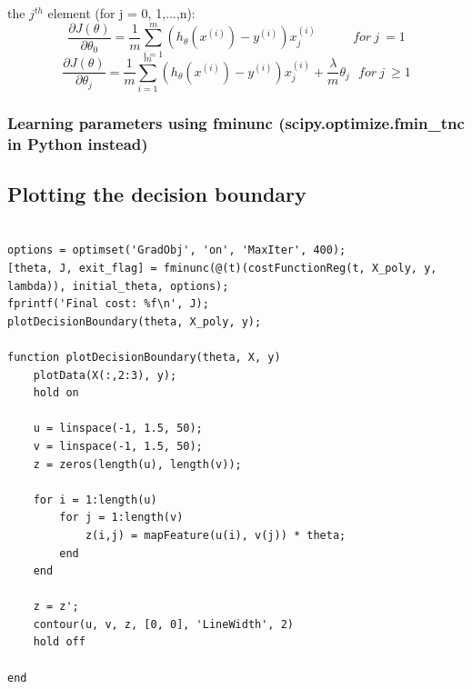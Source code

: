 \documentclass[a4paper, 12pt]{book}
\begin{document}
	\noindent the $j^{th}$ element (for j = 0, 1,...,n):
	\[
		\frac{\partial{J(\theta)} }{\partial {\theta_0}}
		=
		\frac{1}{m}  \sum_{i=1}^{m}  (h_\theta(x^{(i)}) - y^{(i)} ) x_j^{(i)}\ \ \ \ \  \ \ \ \ \ \ \ \ for\ j \ = 1
	\]
	\[
		\frac{\partial{J(\theta)} }{\partial {\theta_j}}
		=
		\frac{1}{m}  \sum_{i=1}^{m}  (h_\theta(x^{(i)}) - y^{(i)} ) x_j^{(i)} + \frac{\lambda}{m}\theta_j\ \ \ for\ j \ \ge 1
	\]
			\subsubsection{Learning parameters using fminunc (scipy.optimize.fmin\_tnc in Python instead) }
		\subsection{Plotting the decision boundary}

	\begin{lstlisting}[caption={My MATLAB Code}]
		
options = optimset('GradObj', 'on', 'MaxIter', 400);
[theta, J, exit_flag] = fminunc(@(t)(costFunctionReg(t, X_poly, y, lambda)), initial_theta, options);
fprintf('Final cost: %f\n', J);
plotDecisionBoundary(theta, X_poly, y);

function plotDecisionBoundary(theta, X, y)
    plotData(X(:,2:3), y);
    hold on

    u = linspace(-1, 1.5, 50);
    v = linspace(-1, 1.5, 50);
    z = zeros(length(u), length(v));

    for i = 1:length(u)
        for j = 1:length(v)
            z(i,j) = mapFeature(u(i), v(j)) * theta;
        end
    end
    
    z = z'; 
    contour(u, v, z, [0, 0], 'LineWidth', 2)
    hold off
    
end
	\end{lstlisting}
		
\end{document}
